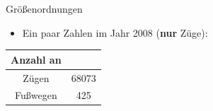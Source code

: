 \begin{frame}{Größenordnungen}
	\begin{itemize}
		\item Ein paar Zahlen im Jahr 2008 (\textbf{nur} Züge):
	\end{itemize}

	\begin{center}
		\begin{tabular}{ c|c } 
			Anzahl an & \\
 			\hline
 			Zügen & 68073 \\ 
 			Fußwegen & 425
		\end{tabular}
	\end{center}
\end{frame}



















